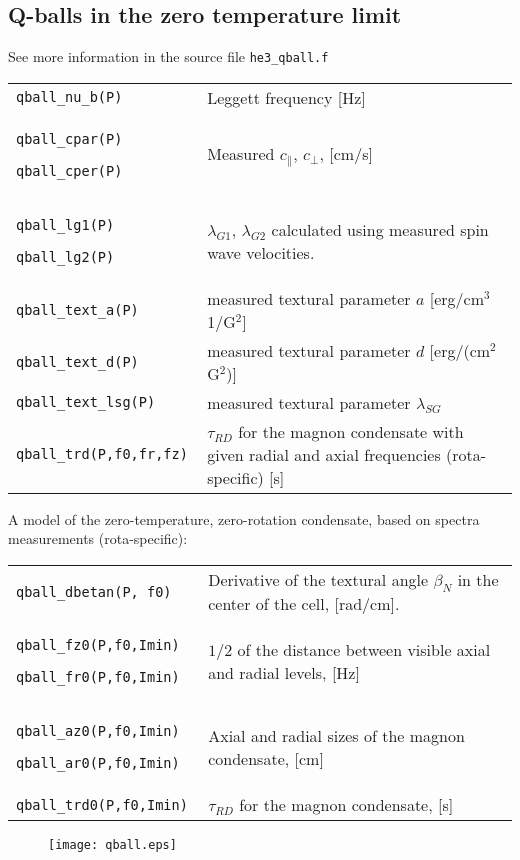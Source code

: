 \documentclass[a4paper]{article}
\begin{document}
\subsection*{Q-balls in the zero temperature limit}
See more information in the source file {\tt he3\_qball.f}

\medskip
\noindent\begin{tabular}{p{4cm}p{11cm}}
\tt qball\_nu\_b(P) & Leggett frequency [Hz]\\
\tt qball\_cpar(P)\par
\tt qball\_cper(P)  & Measured $c_\parallel$, $c_\perp$, [cm/s]\\
\tt qball\_lg1(P)\par
\tt qball\_lg2(P)    & $\lambda_{G1}$, $\lambda_{G2}$ calculated
                      using measured spin wave velocities.\\
\tt qball\_text\_a(P)      &  measured textural parameter $a$ [erg/cm$^3$ 1/G$^2$]\\
\tt qball\_text\_d(P)      &  measured textural parameter $d$ [erg/(cm$^2$ G$^2$)]\\
\tt qball\_text\_lsg(P)    &  measured textural parameter $\lambda_{SG}$\\

\tt qball\_trd(P,f0,fr,fz) & $\tau_{RD}$ for the magnon condensate with given radial and axial frequencies (rota-specific) [s]\\
\end{tabular}

A model of the zero-temperature, zero-rotation condensate, based on spectra measurements (rota-specific):

\medskip
\noindent\begin{tabular}{p{4cm}p{11cm}}
\tt qball\_dbetan(P, f0)  & Derivative of the textural angle $\beta_N$ in the center of the cell, [rad/cm].\\
\tt qball\_fz0(P,f0,Imin)\par
\tt qball\_fr0(P,f0,Imin)  & $1/2$ of the distance between visible axial and radial levels, [Hz]\\
\tt qball\_az0(P,f0,Imin)\par
\tt qball\_ar0(P,f0,Imin)  & Axial and radial sizes of the magnon condensate, [cm]\\
\tt qball\_trd0(P,f0,Imin) & $\tau_{RD}$ for the magnon condensate, [s]\\
\end{tabular}

\begin{figure}[h]
\texttt{[image: qball.eps]}\\
\end{figure}
\end{document}
